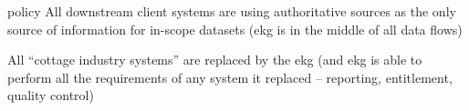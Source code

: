\kgmmscoringlevelFour

\begin{scoring}

    \item [policy] All downstream client systems are using authoritative sources as the only source of information
          for in-scope datasets (\gls{ekg} is in the middle of all data flows)
    \item All “cottage industry systems” are replaced by the \gls{ekg}
          (and \gls{ekg} is able to perform all the requirements of any system it replaced --
         reporting, entitlement, quality control)

\end{scoring}
